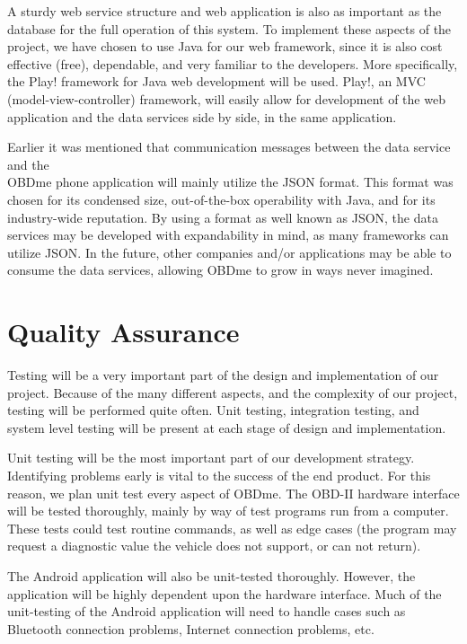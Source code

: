 \documentclass[12pt]{article}
\begin{document}
A sturdy web service structure and web application is also as important as the database for the full operation of this system.  To implement these aspects of the project, we have chosen to use Java for our web framework, since it is also cost effective (free), dependable, and very familiar to the developers.  More specifically, the Play! framework for Java web development will be used.  Play!, an MVC (model-view-controller) framework, will easily allow for development of the web application and the data services side by side, in the same application.

Earlier it was mentioned that communication messages between the data service and the \\ OBDme phone application will mainly utilize the JSON format.  This format was chosen for its condensed size, out-of-the-box operability with Java, and for its industry-wide reputation.  By using a format as well known as JSON, the data services may be developed with expandability in mind, as many frameworks can utilize JSON.  In the future, other companies and/or applications may be able to consume the data services, allowing OBDme to grow in ways never imagined.

\section{Quality Assurance}\label{sec:QualityAssurance}
Testing will be a very important part of the design and implementation of our project.  Because of the many different aspects, and the complexity of our project, testing will be performed quite often.  Unit testing, integration testing, and system level testing will be present at each stage of design and implementation.

Unit testing will be the most important part of our development strategy.  Identifying problems early is vital to the success of the end product.  For this reason, we plan unit test every aspect of OBDme.  The OBD-II hardware interface will be tested thoroughly, mainly by way of test programs run from a computer.  These tests could test routine commands, as well as edge cases (the program may request a diagnostic value the vehicle does not support, or can not return).

The Android application will also be unit-tested thoroughly.  However, the application will be highly dependent upon the hardware interface.  Much of the unit-testing of the Android application will need to handle cases such as Bluetooth connection problems, Internet connection problems, etc.
\end{document}
